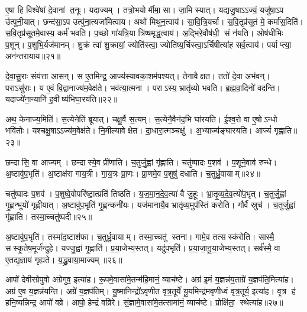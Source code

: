 ए॒षा हि विश्वे॑षां दे॒वानां त॒नूः।
यदाज्यम्।
तत्रो॒भयोर्मीमा॒सा।
जा॒मि स्यात्।
यद्यजु॒षाऽऽज्यं॒ यजु॑षा॒ऽप उ॑त्पुनी॒यात्।
छन्द॑सा॒ऽप उत्पु॑ना॒त्यजा॑मित्वाय।
अथो॑ मिथुन॒त्वाय॑।
सा॒वि॒त्रि॒यर्चा।
स॒वि॒तृप्र॑सूतं मे॒ कर्मा॑स॒दिति॑।
स॒वि॒तृप्र॑सूतमे॒वास्य॒ कर्म॑ भवति।
प॒च्छो गा॑यत्रि॒या त्रि॑ष्षमृद्ध॒त्वाय॑।
अ॒द्भिरे॒वौष॑धी॒ सं न॑यति।
ओष॑धीभिः प॒शून्।
प॒शुभि॒र्यज॑मानम्।
शु॒क्रं त्वा॑ शु॒क्रायां॒ ज्योति॑स्त्वा॒ ज्योति॑ष्य॒र्चिस्त्वा॒ऽर्चिषीत्या॑ह सर्व॒त्वाय॑।
पर्याप्त्या॒ अन॑न्तरायाय॥२१॥\anuvakamend[ई॒क्ष॒त॒ आ॒ह॒ शा॒स्ते॒ लो॒का दे॒वता॑ भवति॒ षट् च॑]

दे॒वा॒सु॒राः संय॑त्ता आसन्।
स ए॒तमिन्द्र॒ आज्य॑स्यावका॒शम॑पश्यत्।
तेनावैक्षत।
ततो॑ दे॒वा अभ॑वन्।
पराऽसु॑राः।
य ए॒वं वि॒द्वानाज्य॑म॒वेक्ष॑ते।
भव॑त्या॒त्मना।
पराऽस्य॒ भ्रातृ॑व्यो भवति।
ब्र॒ह्म॒वा॒दिनो॑ वदन्ति।
यदाज्ये॑ना॒न्यानि॑ ह॒वीष्य॑भिघा॒रय॑ति॥२२॥

अथ॒ केनाज्य॒मिति॑।
स॒त्येनेति॑ ब्रूयात्।
चक्षु॒र्वै स॒त्यम्।
स॒त्येनै॒वैन॑द॒भि घा॑रयति।
ई॒श्व॒रो वा ए॒षोऽन्धो भवि॑तोः।
यश्चक्षु॒षाऽऽज्य॑म॒वेक्ष॑ते।
नि॒मील्यावेक्षेत।
दा॒धारा॒त्मञ्चक्षु॑।
अ॒भ्याज्य॑ङ्घारयति।
आज्यं॑ गृह्णाति॥२३॥

छन्दासि॒ वा आज्यम्।
छन्दास्ये॒व प्री॑णाति।
च॒तुर्जु॒ह्वां गृ॑ह्णाति।
चतु॑ष्पादः प॒शव॑।
प॒शूने॒वाव॑ रुन्धे।
अ॒ष्टावु॑प॒भृति॑।
अ॒ष्टाक्ष॑रा गाय॒त्री।
गा॒य॒त्रः प्रा॒णः।
प्रा॒णमे॒व प॒शुषु॑ दधाति।
च॒तुर्ध्रु॒वायाम्॥२४॥

चतु॑ष्पादः प॒शव॑।
प॒शुष्वे॒वोपरि॑ष्टा॒त्प्रति॑ तिष्ठति।
य॒ज॒मा॒न॒दे॒व॒त्या॑ वै जु॒हूः।
भ्रा॒तृ॒व्य॒दे॒व॒त्यो॑प॒भृत्।
च॒तुर्जु॒ह्वां गृ॒ह्णन्भूयो॑ गृह्णीयात्।
अ॒ष्टावु॑प॒भृति॑ गृ॒ह्णन्कनी॑यः।
यज॑मानायै॒व भ्रातृ॑व्य॒मुप॑स्तिं करोति।
गौर्वै स्रुच॑।
च॒तुर्जु॒ह्वां गृ॑ह्णाति।
तस्मा॒च्चतु॑ष्पदी॥२५॥

अ॒ष्टावु॑प॒भृति॑।
तस्मा॑द॒ष्टाश॑फा।
च॒तुर्ध्रु॒वायाम्।
तस्मा॒च्चतु॑ स्तना।
गामे॒व तत्सस्क॑रोति।
सास्मै॒ सस्कृ॒तेष॒मूर्ज॑न्दुहे।
यज्जु॒ह्वां गृ॒ह्णाति॑।
प्र॒या॒जेभ्य॒स्तत्।
यदु॑प॒भृति॑।
प्र॒या॒जा॒नू॒या॒जेभ्य॒स्तत्।
सर्व॑स्मै॒ वा ए॒तद्य॒ज्ञाय॑ गृह्यते।
य॒द्ध्रु॒वाया॒माज्यम्॥२६॥\anuvakamend[अ॒भि॒घा॒रय॑ति गृह्णाति ध्रु॒वाया॒ञ्चतु॑ष्पदी प्रयाजानूया॒जेभ्य॒स्तद्द्वे च॑]

आपो॑ देवीरग्रेपुवो अग्रेगुव॒ इत्या॑ह।
रू॒पमे॒वासा॑मे॒तन्म॑हि॒मानं॒ व्याच॑ष्टे।
अग्र॑ इ॒मं य॒ज्ञन्न॑य॒ताग्रे॑ य॒ज्ञप॑ति॒मित्या॑ह।
अग्र॑ ए॒व य॒ज्ञन्न॑यन्ति।
अग्रे॑ य॒ज्ञप॑तिम्।
यु॒ष्मानिन्द्रो॑ऽवृणीत वृत्र॒तूर्ये॑ यू॒यमिन्द्र॑मवृणीध्वं वृत्र॒तूर्य॒ इत्या॑ह।
वृ॒त्र ह॑ हनि॒ष्यन्निन्द्र॒ आपो॑ वव्रे।
आपो॒ हेन्द्रं॑ वव्रिरे।
सं॒ज्ञामे॒वासा॑मे॒तत्सामा॑नं॒ व्याच॑ष्टे।
प्रोक्षि॑ता॒ स्थेत्या॑ह॥२७॥

